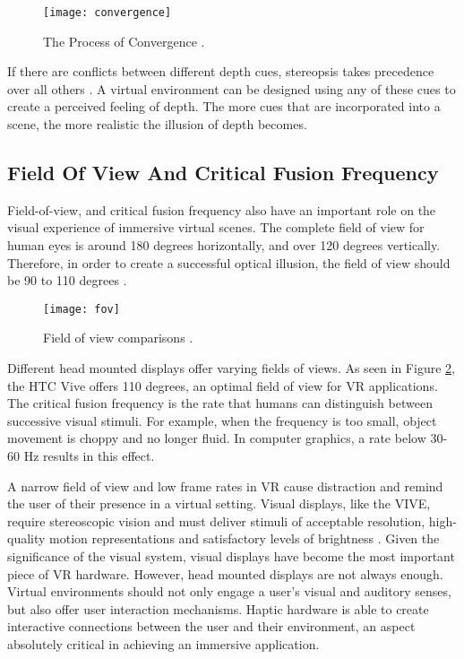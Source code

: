 \begin{figure}[h]
	\centering
	\texttt{[image: convergence]}
	\caption{The Process of Convergence \cite{mihelj_apps}.}
	\label{fig:convergence}
\end{figure}

If there are conflicts between different depth cues, stereopsis takes precedence over all others \cite{mihelj_haptics}. A virtual environment can be designed using any of these cues to create a perceived feeling of depth. The more cues that are incorporated into a scene, the more realistic the illusion of depth becomes.


\subsection{Field Of View And Critical Fusion Frequency} \label{fov_criticalfusionfrequancy} 

Field-of-view, and critical fusion frequency also have an important role on the visual experience of immersive virtual scenes. The complete field of view for human eyes is around 180 degrees horizontally, and over 120 degrees vertically. Therefore, in order to create a successful optical illusion, the field of view should be 90 to 110 degrees \cite{gobbetti}. 
 
 
 \begin{figure}[h]
 	\centering
 	\texttt{[image: fov]}
 	\caption{Field of view comparisons \cite{markiewicz_6_2015}.}
 	\label{fig:fov}	
 \end{figure}

 Different head mounted displays offer varying fields of views. As seen in Figure \ref{fig:fov}, the HTC Vive offers 110 degrees, an optimal field of view for VR applications. The critical fusion frequency is the rate that humans can distinguish between successive visual stimuli. For example, when the frequency is too small, object movement is choppy and no longer fluid. In computer graphics, a rate below 30-60 Hz results in this effect. 
  

 \par  A narrow field of view and low frame rates in VR cause distraction and remind the user of their presence in a virtual setting. Visual displays, like the VIVE, require stereoscopic vision and must deliver stimuli of acceptable resolution, high-quality motion representations and satisfactory levels of brightness \cite{gobbetti}. Given the significance of the visual system, visual displays have become the most important piece of VR hardware. However, head mounted displays are not always enough. Virtual environments should not only engage a user's visual and auditory senses, but also offer user interaction mechanisms. Haptic hardware is able to create interactive connections between the user and their environment, an aspect absolutely critical in achieving an immersive application.
 
